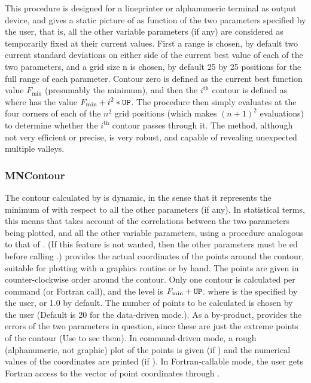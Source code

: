 This procedure is designed for a lineprinter or alphanumeric
terminal as output device, and gives a static picture of 
as function of the two parameters specified by the user, that is,
all the other variable parameters (if any) are considered as
temporarily fixed at their current values.  First a range is
chosen, by default two current standard deviations on either
side of the current best value of each of the two parameters,
and a grid size n is chosen, by default 25 by 25 positions
for the full range of each parameter.  Contour zero is defined
as the current best function value $\displaystyle F_{\mathrm{min}}$
(presumably the minimum), and then the $\displaystyle i^{\mathrm{th}}$
contour is defined as where  has the value
$\displaystyle F_{\mathrm{min}} + i^2 * \mbox{\tt UP}$.
The procedure then simply evaluates  at the four corners of
each of the $n^2$ grid positions (which makes $(n+1)^2$ evaluations)
to determine whether the $\displaystyle i^{\mathrm{th}}$ contour passes through
it. The method, although not very efficient or precise,
is very robust, and capable of revealing unexpected
multiple valleys.
 
\subsubsection{MNContour}

The contour calculated by  is dynamic, in the sense
that it represents the minimum of  with respect to all the
other  parameters (if any). In statistical terms, this
means that  takes account of the correlations between
the two parameters being plotted, and all the other variable
parameters, using a procedure analogous to that of .
(If this feature is not wanted, then the other
parameters must be ed before calling .)
 provides the actual coordinates of the points around
the contour, suitable for plotting with a graphics routine or
by hand. The points are given in counter-clockwise order
around the contour.
Only one contour is calculated per command (or Fortran call),
and the level is $\displaystyle F_{\mathrm{min}} + \mbox{\tt UP}$.
where  is the
 specified by the user, or 1.0 by default.
The number of points to be calculated is chosen by
the user (Default is 20 for the data-driven mode.).
As a by-product,  provides the  errors of the
two parameters in question, since these are just the extreme
points of the contour (Use  to see them).
In command-driven mode, a rough (alphanumeric, not graphic)
plot of the points is given 
(if ) 
and the numerical values of the coordinates are printed 
(if ).
In Fortran-callable mode, the user gets Fortran
access to the vector of point coordinates through
.
